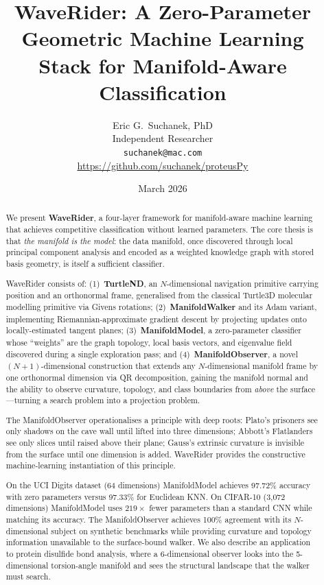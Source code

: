\documentclass[12pt,letterpaper]{article}
\title{\textbf{WaveRider: A Zero-Parameter Geometric Machine Learning\\
Stack for Manifold-Aware Classification}}
\author{
  Eric G.\ Suchanek, PhD\\
  Independent Researcher\\
  \texttt{suchanek@mac.com}\\[4pt]
  \small\url{https://github.com/suchanek/proteusPy}
}
\date{March 2026}
\begin{document}
\maketitle

\begin{abstract}
We present \textbf{WaveRider}, a four-layer framework for manifold-aware machine
learning that achieves competitive classification without learned parameters.
The core thesis is that \emph{the manifold is the model}: the data manifold,
once discovered through local principal component analysis and encoded as a
weighted knowledge graph with stored basis geometry, is itself a sufficient
classifier.

WaveRider consists of: (1)~\textbf{TurtleND}, an $N$-dimensional navigation
primitive carrying position and an orthonormal frame, generalised from the
classical Turtle3D molecular modelling primitive via Givens rotations;
(2)~\textbf{ManifoldWalker} and its Adam variant, implementing
Riemannian-approximate gradient descent by projecting updates onto
locally-estimated tangent planes; (3)~\textbf{ManifoldModel}, a zero-parameter
classifier whose ``weights'' are the graph topology, local basis vectors, and
eigenvalue field discovered during a single exploration pass; and
(4)~\textbf{ManifoldObserver}, a novel $(N+1)$-dimensional construction that
extends any $N$-dimensional manifold frame by one orthonormal dimension via QR
decomposition, gaining the manifold normal and the ability to observe curvature,
topology, and class boundaries from \emph{above} the surface---turning a search
problem into a projection problem.

The ManifoldObserver operationalises a principle with deep roots: Plato's
prisoners see only shadows on the cave wall until lifted into three dimensions;
Abbott's Flatlanders see only slices until raised above their plane; Gauss's
extrinsic curvature is invisible from the surface until one dimension is added.
WaveRider provides the constructive machine-learning instantiation of this
principle.

On the UCI Digits dataset (64 dimensions) ManifoldModel achieves 97.72\%
accuracy with zero parameters versus 97.33\% for Euclidean KNN\@.
On CIFAR-10 (3{,}072 dimensions) ManifoldModel uses $219{\times}$ fewer parameters
than a standard CNN while matching its accuracy.
The ManifoldObserver achieves 100\% agreement with its $N$-dimensional subject
on synthetic benchmarks while providing curvature and topology information
unavailable to the surface-bound walker.
We also describe an application to protein disulfide bond analysis, where a
6-dimensional observer looks into the 5-dimensional torsion-angle manifold and
sees the structural landscape that the walker must search.
\end{abstract}
\end{document}
